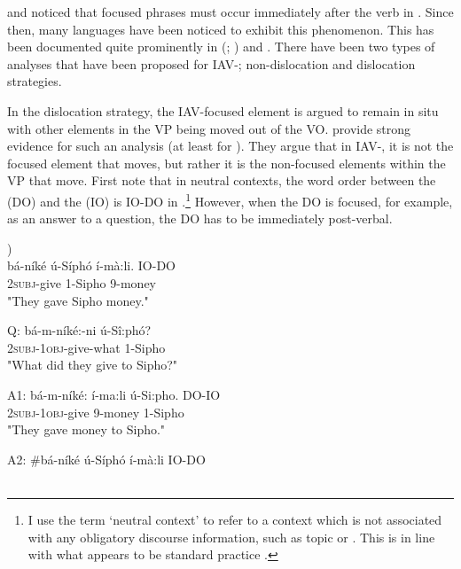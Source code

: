 \documentclass[output=paper,newtxmath,modfonts,nonflat,draft]{langsci/langscibook}
\begin{document}
\citet{hyman1979nounstructure} and \citet{watters1979} noticed that focused phrases must occur immediately after the verb in . Since then, many  languages have been noticed to exhibit this phenomenon. This has been documented quite prominently in  (\citealt{Buell2009}; \citealt{chengdowning2012}) and  \citep{vanderwal2006}. There have been two types of analyses that have been proposed for IAV-; non-dislocation and dislocation strategies. 

In the dislocation strategy, the IAV-focused element is argued to remain in situ with other elements in the VP being moved out of the VO. \citet{chengdowning2012} provide strong evidence for such an analysis (at least for ). They argue that in  IAV-, it is not the focused element that moves, but rather it is the non-focused elements within the VP that move. First note that in neutral contexts, the word order between the  (DO) and the  (IO) is IO-DO in .\footnote{I use the term ‘neutral context’ to refer to a context which is not associated with any obligatory discourse information, such as topic or . This is in line with what appears to be standard practice \citep{Diercks2013,diercks2015}.}  However, when the DO is focused, for example, as an answer to a question, the DO has to be immediately post-verbal.

\ea\label{ex:selvanathan:1}
 \citep[2]{chengdowning2012})\\

\ea\label{ex:selvanathan:1a}
\gll bá-níké   ú-Síphó  í-mà:li.       IO-DO \\
\textsc{2subj}{}-give  1-Sipho     9-money {} \\
\glt "They gave Sipho money." 

\ex\label{ex:selvanathan:1b}
	Q: \gll bá-m-níké:-ni      ú-Sî:phó? \\
	\textsc{2subj}{}-\textsc{1obj}{}-give-what    1-Sipho \\
	\glt "What did they give to Sipho?"

	A1: \gll bá-m-níké:      í-ma:li   ú-Si:pho.    DO-IO \\
	\textsc{2subj}{}-\textsc{1obj}{}-give   9-money   1-Sipho \\
	\glt "They gave money to Sipho." 

	A2: \gll \#bá-níké   ú-Síphó  í-mà:li    IO-DO \\
	\\
\z
\z
\end{document}
